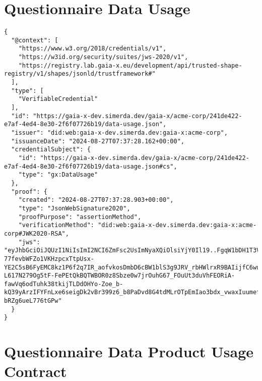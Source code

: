 \section{Questionnaire Data Usage}

\begin{verbatim}
{
  "@context": [
    "https://www.w3.org/2018/credentials/v1",
    "https://w3id.org/security/suites/jws-2020/v1",
    "https://registry.lab.gaia-x.eu/development/api/trusted-shape-registry/v1/shapes/jsonld/trustframework#"
  ],
  "type": [
    "VerifiableCredential"
  ],
  "id": "https://gaia-x-dev.simerda.dev/gaia-x/acme-corp/241de422-e7af-4ed4-8e30-2f6f07726b19/data-usage.json",
  "issuer": "did:web:gaia-x-dev.simerda.dev:gaia-x:acme-corp",
  "issuanceDate": "2024-08-27T07:37:28.162+00:00",
  "credentialSubject": {
    "id": "https://gaia-x-dev.simerda.dev/gaia-x/acme-corp/241de422-e7af-4ed4-8e30-2f6f07726b19/data-usage.json#cs",
    "type": "gx:DataUsage"
  },
  "proof": {
    "created": "2024-08-27T07:37:28.903+00:00",
    "type": "JsonWebSignature2020",
    "proofPurpose": "assertionMethod",
    "verificationMethod": "did:web:gaia-x-dev.simerda.dev:gaia-x:acme-corp#JWK2020-RSA",
    "jws": "eyJhbGciOiJQUzI1NiIsImI2NCI6ZmFsc2UsImNyaXQiOlsiYjY0Il19..FgqW1bDH1T3VjPN4VxBlIZx3VTgtEET8mxbWXqgNMsdQ-77fevbWFZo1VKHzpcxTtpUsx-YE2C5sB6FyEMC8kz1P6f2q7IR_aofvkosDmbD6cBW1blS3g9JRV_rbHWlrxR9BAIijfC6wuqukh44UYTyLrc-L617N279Og5tF-FePEtQkBQTWBOR0z8Sbze0w7jrOuhG67_FOuUt3duVhFEORiA-fawVq6odTuhk38tkijTLDdOHYo-Zoe_b-kQ39yArzIFYFnLxe6seigDk2vBr399z6_b8PaDvd8G4tdMLrOTpEmIao3bdx_vwaxIuumefpw6-bRZg6ueL776tGPw"
  }
}
\end{verbatim}

\section{Questionnaire Data Product Usage Contract}

